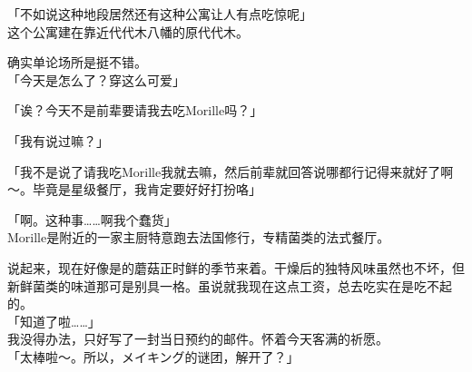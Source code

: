 「不如说这种地段居然还有这种公寓让人有点吃惊呢」\\

这个公寓建在靠近代代木八幡的原代代木。

确实单论场所是挺不错。\\

「今天是怎么了？穿这么可爱」

「诶？今天不是前辈要请我去吃Morille吗？」

「我有说过嘛？」

「我不是说了请我吃Morille我就去嘛，然后前辈就回答说哪都行记得来就好了啊～。毕竟是星级餐厅，我肯定要好好打扮咯」

「啊。这种事……啊我个蠢货」\\

Morille是附近的一家主厨特意跑去法国修行，专精菌类的法式餐厅。

说起来，现在好像是的蘑菇正时鲜的季节来着。干燥后的独特风味虽然也不坏，但新鲜菌类的味道那可是别具一格。虽说就我现在这点工资，总去吃实在是吃不起的。\\

「知道了啦……」\\

我没得办法，只好写了一封当日预约的邮件。怀着今天客满的祈愿。\\

「太棒啦～。所以，メイキング的谜团，解开了？」

